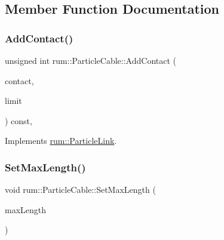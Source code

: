 \subsection{Member Function Documentation}
\mbox{\label{classrum_1_1_particle_cable_a06c6184b7e1d6047db4f732b132fb329}} 
\subsubsection{\texorpdfstring{Add\+Contact()}{AddContact()}}
{\footnotesize\ttfamily unsigned int rum\+::\+Particle\+Cable\+::\+Add\+Contact (\begin{DoxyParamCaption}\item[{\hyperlink{classrum_1_1_particle_contact}{Particle\+Contact} $\ast$}]{contact,  }\item[{unsigned int}]{limit }\end{DoxyParamCaption}) const\hspace{0.3cm}{\ttfamily [override]}, {\ttfamily [virtual]}}



Implements \hyperlink{classrum_1_1_particle_link_a86e7dbac23cd26fce627bf5ed1fae6f5}{rum\+::\+Particle\+Link}.

\mbox{\label{classrum_1_1_particle_cable_a24400de0c86bf3ec7dfe61b48090d0a1}} 
\subsubsection{\texorpdfstring{Set\+Max\+Length()}{SetMaxLength()}}
{\footnotesize\ttfamily void rum\+::\+Particle\+Cable\+::\+Set\+Max\+Length (\begin{DoxyParamCaption}\item[{\hyperlink{namespacerum_a7e8cca23573d5eaead0f138cbaa4862c}{real}}]{max\+Length }\end{DoxyParamCaption})}

\mbox{\label{classrum_1_1_particle_cable_af6996d42d05186d34ca0db7c2ea766ff}} 
